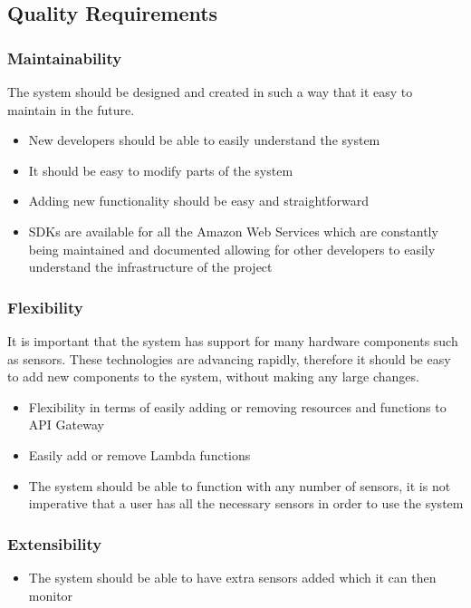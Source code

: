 \documentclass{article}
\begin{document}
\subsection{Quality Requirements}

\subsubsection{Maintainability}
The system should be designed and created in such a way that it easy to maintain in the future.
\begin{itemize}
	\item New developers should be able to easily understand the system
	\item It should be easy to modify parts of the system
	\item Adding new functionality should be easy and straightforward
	\item SDKs are available for all the Amazon Web Services which are constantly being maintained and documented allowing for other developers to easily understand the infrastructure of the project
\end{itemize}
\subsubsection{Flexibility}
It is important that the system has support for many hardware components such as sensors. These technologies are advancing rapidly, therefore it should be easy to add new components to the system, without making any large changes.

	\begin{itemize}
		\item Flexibility in terms of easily adding or removing resources and functions to API Gateway
		\item Easily add or remove Lambda functions
		\item The system should be able to function with any number of sensors, it is not imperative that a user has all the necessary sensors in order to use the system
	\end{itemize}
\subsubsection{Extensibility}
	\begin{itemize}
		\item The system should be able to have extra sensors added which it can then monitor
	\end{itemize}
\end{document}
